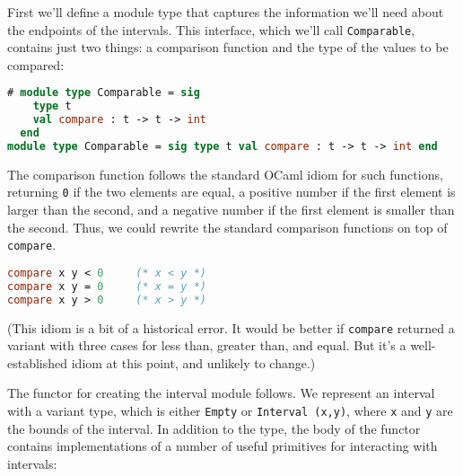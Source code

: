 First we'll define a module type that captures the information we'll
need about the endpoints of the intervals. This interface, which we'll
call \passthrough{\lstinline!Comparable!}, contains just two things: a
comparison function and the type of the values to be compared:

\begin{lstlisting}[language=Caml]
# module type Comparable = sig
    type t
    val compare : t -> t -> int
  end
module type Comparable = sig type t val compare : t -> t -> int end
\end{lstlisting}

The comparison function follows the standard OCaml idiom for such
functions, returning \passthrough{\lstinline!0!} if the two elements are
equal, a positive number if the first element is larger than the second,
and a negative number if the first element is smaller than the second.
Thus, we could rewrite the standard comparison functions on top of
\passthrough{\lstinline!compare!}.

\begin{lstlisting}[language=Caml]
compare x y < 0     (* x < y *)
compare x y = 0     (* x = y *)
compare x y > 0     (* x > y *)
\end{lstlisting}

(This idiom is a bit of a historical error. It would be better if
\passthrough{\lstinline!compare!} returned a variant with three cases
for less than, greater than, and equal. But it's a well-established
idiom at this point, and unlikely to change.)

The functor for creating the interval module follows. We represent an
interval with a variant type, which is either
\passthrough{\lstinline!Empty!} or
\passthrough{\lstinline!Interval (x,y)!}, where
\passthrough{\lstinline!x!} and \passthrough{\lstinline!y!} are the
bounds of the interval. In addition to the type, the body of the functor
contains implementations of a number of useful primitives for
interacting with intervals:

